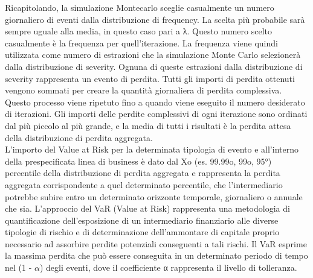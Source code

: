 \documentclass[titlepage]{article}
\begin{document}
\begin{itemize}
{\begin{itemize}
\end{itemize}
Ricapitolando, la simulazione Montecarlo sceglie casualmente un numero giornaliero di eventi dalla distribuzione di frequency. La scelta più probabile sarà sempre uguale alla media, in questo caso pari a λ. Questo numero scelto casualmente è la frequenza per quell’iterazione. La frequenza viene quindi utilizzata come numero di estrazioni che la simulazione Monte Carlo selezionerà dalla distribuzione di severity. Ognuna di queste estrazioni dalla distribuzione di severity rappresenta un evento di perdita. Tutti gli importi di perdita ottenuti vengono sommati per creare la quantità giornaliera di perdita complessiva. Questo processo viene ripetuto fino a quando viene eseguito il numero desiderato di iterazioni. Gli importi delle perdite complessivi di ogni iterazione sono ordinati dal più piccolo al più grande, e la media di tutti i risultati è la perdita attesa della distribuzione di perdita aggregata.
\\
L'importo del Value at Risk per la determinata tipologia di evento e all’interno della prespecificata linea di business è dato dal Xo (es. 99.99o, 99o, 95°) percentile della distribuzione di perdita aggregata e rappresenta la perdita aggregata corrispondente a quel determinato percentile, che l’intermediario potrebbe subire entro un determinato orizzonte temporale, giornaliero o annuale che sia. L’approccio del VaR (Value at Risk) rappresenta una metodologia di quantificazione dell’esposizione di un intermediario finanziario alle diverse tipologie di rischio e di determinazione dell’ammontare di capitale proprio necessario ad assorbire perdite potenziali conseguenti a tali rischi. Il VaR esprime la massima perdita che può essere conseguita in un determinato periodo di tempo nel (1 - $\alpha$) degli eventi, dove il coefficiente α rappresenta il livello di tolleranza.
\\

}
\end{itemize}
\end{document}
